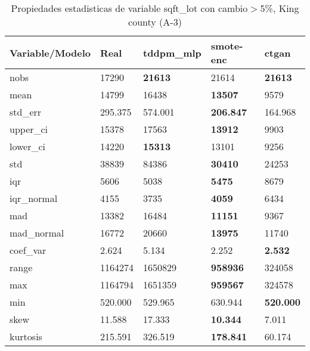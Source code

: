 \begin{table}[H]
\centering
\fontsize{8}{14}\selectfont
\caption{Propiedades estadisticas de variable sqft\_lot con cambio\ensuremath{>}5\%, King county (A-3)}
\label{table-stats-king county-a-3-sqft_lot-short}
\begin{tabular}{|l|m{10em}|m{10em}|m{10em}|m{10em}|}
\hline
 \rowcolor[gray]{0.8}
Variable/Modelo & Real & tddpm\_mlp & smote-enc & ctgan \\
\hline nobs & 17290 & \bfseries 21613 & \cellcolor[rgb]{0.9, 0.54, 0.52} 21614 & \bfseries 21613 \\
\hline mean & 14799 & 16438 & \bfseries 13507 & \cellcolor[rgb]{0.9, 0.54, 0.52} 9579 \\
\hline std\_err & 295.375 & \cellcolor[rgb]{0.9, 0.54, 0.52} 574.001 & \bfseries 206.847 & 164.968 \\
\hline upper\_ci & 15378 & 17563 & \bfseries 13912 & \cellcolor[rgb]{0.9, 0.54, 0.52} 9903 \\
\hline lower\_ci & 14220 & \bfseries 15313 & 13101 & \cellcolor[rgb]{0.9, 0.54, 0.52} 9256 \\
\hline std & 38839 & \cellcolor[rgb]{0.9, 0.54, 0.52} 84386 & \bfseries 30410 & 24253 \\
\hline iqr & 5606 & 5038 & \bfseries 5475 & \cellcolor[rgb]{0.9, 0.54, 0.52} 8679 \\
\hline iqr\_normal & 4155 & 3735 & \bfseries 4059 & \cellcolor[rgb]{0.9, 0.54, 0.52} 6434 \\
\hline mad & 13382 & 16484 & \bfseries 11151 & \cellcolor[rgb]{0.9, 0.54, 0.52} 9367 \\
\hline mad\_normal & 16772 & 20660 & \bfseries 13975 & \cellcolor[rgb]{0.9, 0.54, 0.52} 11740 \\
\hline coef\_var & 2.624 & \cellcolor[rgb]{0.9, 0.54, 0.52} 5.134 & 2.252 & \bfseries 2.532 \\
\hline range & 1164274 & 1650829 & \bfseries 958936 & \cellcolor[rgb]{0.9, 0.54, 0.52} 324058 \\
\hline max & 1164794 & 1651359 & \bfseries 959567 & \cellcolor[rgb]{0.9, 0.54, 0.52} 324578 \\
\hline min & 520.000 & 529.965 & \cellcolor[rgb]{0.9, 0.54, 0.52} 630.944 & \bfseries 520.000 \\
\hline skew & 11.588 & \cellcolor[rgb]{0.9, 0.54, 0.52} 17.333 & \bfseries 10.344 & 7.011 \\
\hline kurtosis & 215.591 & 326.519 & \bfseries 178.841 & \cellcolor[rgb]{0.9, 0.54, 0.52} 60.174 \\

\end{tabular}
\end{table}
